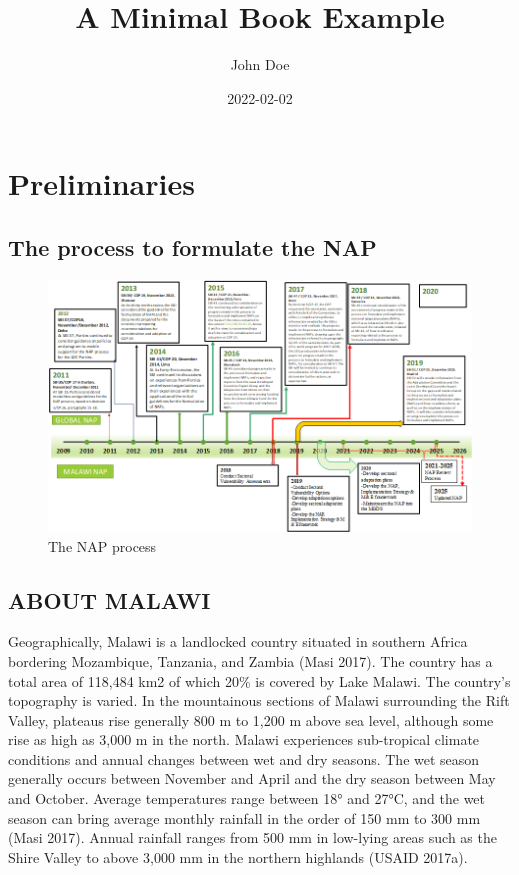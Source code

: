 \documentclass[
]{book}
\title{A Minimal Book Example}
\author{John Doe}
\date{2022-02-02}
\begin{document}
\maketitle

{
\setcounter{tocdepth}{1}
\tableofcontents
}
\hypertarget{preliminaries}{%
\chapter*{Preliminaries}\label{preliminaries}}

\hypertarget{the-process-to-formulate-the-nap}{%
\section*{The process to formulate the NAP}\label{the-process-to-formulate-the-nap}}

\begin{figure}
\centering
\includegraphics{images/nap_process.png}
\caption{The NAP process}
\end{figure}

\hypertarget{about-malawi}{%
\section*{ABOUT MALAWI}\label{about-malawi}}

Geographically, Malawi is a landlocked country situated in southern Africa bordering Mozambique, Tanzania, and Zambia (Masi 2017). The country has a total area of 118,484 km2 of which 20\% is covered by Lake Malawi. The country's topography is varied. In the mountainous sections of Malawi surrounding the Rift Valley, plateaus rise generally 800 m to 1,200 m above sea level, although some rise as high as 3,000 m in the north. Malawi experiences sub-tropical climate conditions and annual changes between wet and dry seasons. The wet season generally occurs between November and April and the dry season between May and October. Average temperatures range between 18° and 27°C, and the wet season can bring average monthly rainfall in the order of 150 mm to 300 mm (Masi 2017). Annual rainfall ranges from 500 mm in low-lying areas such as the Shire Valley to above 3,000 mm in the northern highlands (USAID 2017a).
\end{document}
